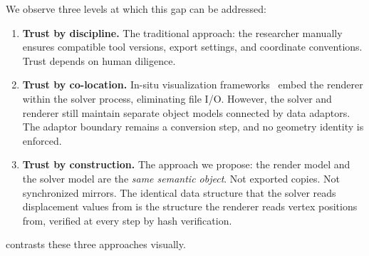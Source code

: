 \documentclass[journal]{IEEEtran}
\begin{document}
We observe three levels at which this gap can be addressed:

\begin{enumerate}
  \item \textbf{Trust by discipline.} The traditional approach: the researcher
    manually ensures compatible tool versions, export settings, and coordinate
    conventions. Trust depends on human diligence.
  \item \textbf{Trust by co-location.} In-situ visualization
    frameworks~\cite{Catalyst2016,SENSEI2017} embed the renderer within the
    solver process, eliminating file I/O. However, the solver and renderer
    still maintain separate object models connected by data adaptors. The
    adaptor boundary remains a conversion step, and no geometry identity is
    enforced.
  \item \textbf{Trust by construction.} The approach we propose: the render
    model and the solver model are the \emph{same semantic object}. Not
    exported copies. Not synchronized mirrors. The identical data structure
    that the solver reads displacement values from is the structure the
    renderer reads vertex positions from, verified at every step by
    hash verification.
\end{enumerate}

 contrasts these three approaches visually.
\end{document}
